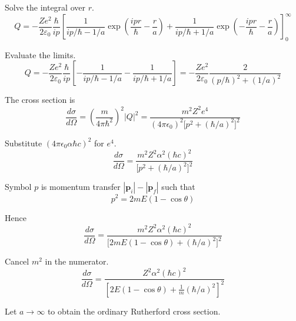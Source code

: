 Solve the integral over $r$.
\begin{equation*}
Q=-\frac{Ze^2}{2\varepsilon_0}
\frac{\hbar}{ip}
\left[
\frac{1}{ip/\hbar-1/a}
\exp\left(\frac{ipr}{\hbar}-\frac{r}{a}\right)
+\frac{1}{ip/\hbar+1/a}
\exp\left(-\frac{ipr}{\hbar}-\frac{r}{a}\right)
\right]_0^\infty
\end{equation*}

Evaluate the limits.
\begin{equation*}
Q=-\frac{Ze^2}{2\varepsilon_0}
\frac{\hbar}{ip}
\left[
-\frac{1}{ip/\hbar-1/a}
-\frac{1}{ip/\hbar+1/a}
\right]
=-\frac{Ze^2}{2\varepsilon_0}\frac{2}{(p/\hbar)^2+(1/a)^2}
\tag{1}
\end{equation*}

The cross section is
\begin{equation*}
\frac{d\sigma}{d\Omega}
=\left(\frac{m}{4\pi\hbar^2}\right)^2|Q|^2
=\frac{m^2Z^2e^4}{(4\pi\epsilon_0)^2\bigl[p^2+(\hbar/a)^2\bigr]^2}
\tag{2}
\end{equation*}

Substitute $(4\pi\epsilon_0\alpha\hbar c)^2$ for $e^4$.
\begin{equation*}
\frac{d\sigma}{d\Omega}
=\frac{m^2Z^2\alpha^2(\hbar c)^2}{\bigl[p^2+(\hbar/a)^2\bigr]^2}
\end{equation*}

Symbol $p$ is momentum transfer $|\mathbf p_i|-|\mathbf p_f|$ such that
\begin{equation*}
p^2=2mE(1-\cos\theta)
\end{equation*}

Hence
\begin{equation*}
\frac{d\sigma}{d\Omega}
=\frac{m^2Z^2\alpha^2(\hbar c)^2}{\bigl[2mE(1-\cos\theta)+(\hbar/a)^2\bigr]^2}
\end{equation*}

Cancel $m^2$ in the numerator.
\begin{equation*}
\frac{d\sigma}{d\Omega}
=\frac{Z^2\alpha^2(\hbar c)^2}{\left[2E(1-\cos\theta)+\frac{1}{m}(\hbar/a)^2\right]^2}
\tag{3}
\end{equation*}

Let $a\rightarrow\infty$ to obtain the ordinary Rutherford cross section.


